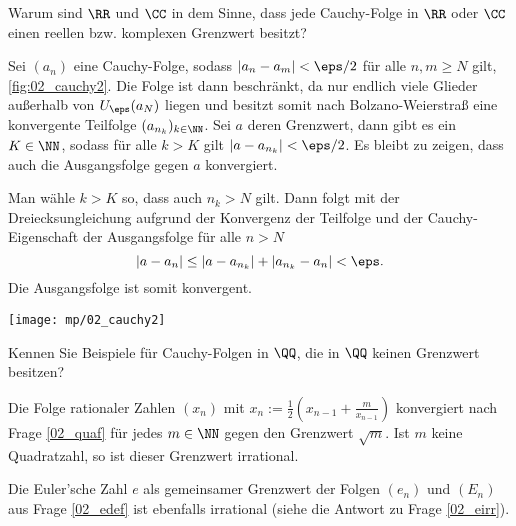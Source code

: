 \begin{frage}%
  \label{02_cfb}
  Warum sind $\RR$ und $\CC$  in dem Sinne, dass 
  jede Cauchy-Folge in $\RR$ oder $\CC$ einen reellen bzw. 
  komplexen Grenzwert besitzt?
\end{frage}

\begin{antwort}
  Sei $(a_n)$ eine Cauchy-Folge, sodass $|a_n-a_m| < \eps/2 $ für alle 
  $n,m \ge N$ gilt, \sieheAbbildung\ref{fig:02_cauchy2}. 
  Die Folge ist dann beschränkt, da nur endlich viele 
  Glieder außerhalb von $U_\eps( a_N)$ liegen und 
  besitzt somit nach Bolzano-Weierstraß eine konvergente 
  Teilfolge $(a_{n_k})_{k\in\NN}$. Sei $a$ deren 
  Grenzwert, dann gibt es ein $K\in\NN$, sodass für alle 
  $k>K$ gilt $|a-a_{n_k}| < \eps/2$. Es bleibt zu zeigen, 
  dass auch die Ausgangsfolge gegen $a$ konvergiert. 

  Man wähle $k>K$ so, dass auch $n_k>N$ gilt. 
  Dann folgt mit der Dreiecksungleichung 
  aufgrund der Konvergenz der Teilfolge und der 
  Cauchy-Eigenschaft der Ausgangsfolge für alle $n>N$
  \[
  |a-a_n| \le |a-a_{n_k}| + | a_{n_k} - a_n | < \eps.
  \]      
  Die Ausgangsfolge ist somit konvergent.
  \AntEnd

  \begin{center}
    \texttt{[image: mp/02\_cauchy2]}
    \label{fig:02_cauchy2}
  \end{center}  
\end{antwort}

\begin{frage}%
  \label{02_cfc}
  Kennen Sie Beispiele für Cauchy-Folgen in $\QQ$, die in $\QQ$ keinen 
  Grenzwert besitzen? 
\end{frage}

\begin{antwort}
  Die Folge rationaler Zahlen $(x_n)$ mit $
  x_n := \frac{1}{2} \left( x_{n-1} + \frac{m}{x_{n-1}} \right)$ 
  konvergiert nach Frage \ref{02_quaf} für jedes 
  $m\in\NN$ gegen den Grenzwert $\sqrt{m}$. Ist $m$ keine Quadratzahl, so ist 
  dieser Grenzwert irrational.

  Die Euler'sche Zahl $e$ als 
  gemeinsamer Grenzwert der Folgen $(e_n)$ und $(E_n)$ aus 
  Frage \ref{02_edef} ist ebenfalls irrational 
  (siehe die Antwort zu Frage \ref{02_eirr}).
  \AntEnd
\end{antwort}

